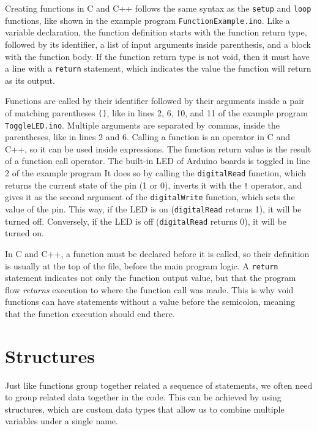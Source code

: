 Creating functions in C and C++ follows the same syntax as the \texttt{setup} and \texttt{loop} functions, like shown in the example program \texttt{FunctionExample.ino}.
Like a variable declaration, the function definition starts with the function return type, followed by its identifier, a list of input arguments inside parenthesis, and a block with the function body.
If the function return type is not void, then it must have a line with a \texttt{return} statement, which indicates the value the function will return as its output.

\clearpage
{}

Functions are called by their identifier followed by their arguments inside a pair of matching parentheses \texttt{()}, like in lines 2, 6, 10, and 11 of the example program \texttt{ToggleLED.ino}.
Multiple arguments are separated by commas, inside the parentheses, like in lines 2 and 6.
Calling a function is an operator in C and C++, so it can be used inside expressions.
The function return value is the result of a function call operator.
The built-in LED of Arduino boards is toggled in line 2 of the example program
It does so by calling the \texttt{digitalRead} function, which returns the current state of the pin (1 or 0), inverts it with the \texttt{!} operator, and gives it as the second argument of the \texttt{digitalWrite} function, which sets the value of the pin.
This way, if the LED is on (\texttt{digitalRead} returns 1), it will be turned off.
Conversely, if the LED is off (\texttt{digitalRead} returns 0), it will be turned on.

In C and C++, a function must be declared before it is called, so their definition is usually at the top of the file, before the main program logic.
A \texttt{return} statement indicates not only the function output value, but that the program flow \emph{returns} execution to where the function call was made.
This is why void functions can have  statements without a value before the semicolon, meaning that the function execution should end there.

\section{Structures}
Just like functions group together related a sequence of statements, we often need to group related data together in the code.
This can be achieved by using structures, which are custom data types that allow us to combine multiple variables under a single name.

